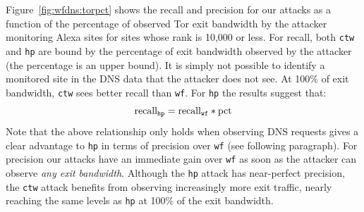 Figure~\ref{fig:wfdns:torpct} shows the recall and precision for our \name
attacks as a function of the percentage of observed Tor exit bandwidth by the
attacker monitoring Alexa sites for sites whose rank is 10,000 or less.
For recall, both \texttt{ctw} and \texttt{hp} are bound by the
percentage of exit bandwidth observed by the attacker (the percentage is an
upper bound).
It is simply not possible to identify a monitored site in the DNS data that
the attacker does not see. At 100\% of exit bandwidth, \texttt{ctw} sees
better recall than \texttt{wf}. For \texttt{hp} the results suggest that:
\begin{equation}
	\label{eq:hprecall}
	\textnormal{recall}_{\texttt{hp}} = \textnormal{recall}_{\texttt{wf}} * \textnormal{pct}
\end{equation}
Note that the above relationship only holds when observing DNS requests gives
a clear advantage to \texttt{hp} in terms of precision over \texttt{wf} (see
following paragraph).
For precision our attacks have an immediate gain over \texttt{wf} as soon as
the attacker can observe \emph{any exit bandwidth}.
Although the \texttt{hp} attack has near-perfect precision, the
\texttt{ctw} attack benefits from observing increasingly more exit traffic,
nearly reaching the same levels as \texttt{hp} at 100\% of the exit bandwidth.


